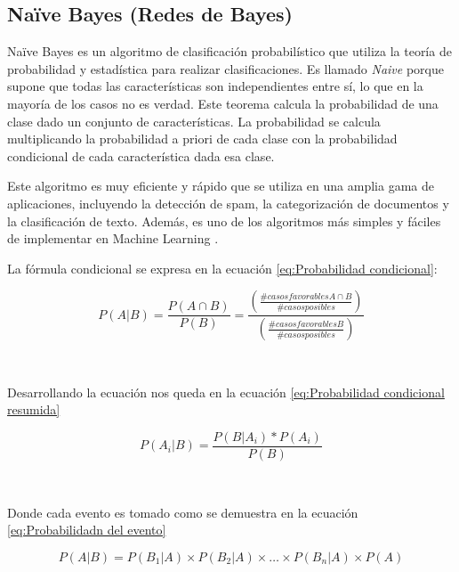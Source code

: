 \doublespacing
\subsection{Naïve Bayes (Redes de Bayes)}
\label{sec:NB}
Naïve Bayes es un algoritmo de clasificación probabilístico que utiliza la teoría de probabilidad y estadística para realizar clasificaciones. Es llamado \emph{Naive} porque supone que todas las características son independientes entre sí, lo que en la mayoría de los casos no es verdad. Este teorema calcula la probabilidad de una clase dado un conjunto de características. La probabilidad se calcula multiplicando la probabilidad a priori de cada clase con la probabilidad condicional de cada característica dada esa clase\cite{Vembandasamy2015}. \\
\par Este algoritmo es muy eficiente y rápido que se utiliza en una amplia gama de aplicaciones, incluyendo la detección de spam, la categorización de documentos y la clasificación de texto. Además, es uno de los algoritmos más simples y fáciles de implementar en Machine Learning \cite{Vembandasamy2015}.\\

\par La fórmula condicional se expresa en la ecuación \ref{eq:Probabilidad condicional}:\\
\begin{Large}
	\begin{equation}
		P(A|B)=\frac{P(A \cap B)}{P(B)}= \frac{(\frac{\#casos favorables A \cap B}{\#casos posibles})}{(\frac{\#casos favorables B}{\#casos posibles})}
		\label{eq:Probabilidad condicional}
	\end{equation}
\end{Large}\\
\par Desarrollando la ecuación nos queda en la ecuación \ref{eq:Probabilidad condicional resumida}\\
\begin{Large}
	\begin{equation}
		P(A_{i}|B)=\frac{P(B|A_{i})*P(A_{i})}{P(B)}
		\label{eq:Probabilidad condicional resumida}
	\end{equation}
\end{Large}\\
\par Donde cada evento es tomado como se demuestra en la ecuación \ref{eq:Probabilidadn del evento}\\
\begin{large}
	\begin{equation}
		P(A|B)= P(B_{1}|A) \times P(B_{2}|A) \times … \times P(B_{n}|A) \times P(A)
		\label{eq:Probabilidadn del evento}
	\end{equation}
\end{large}\\

